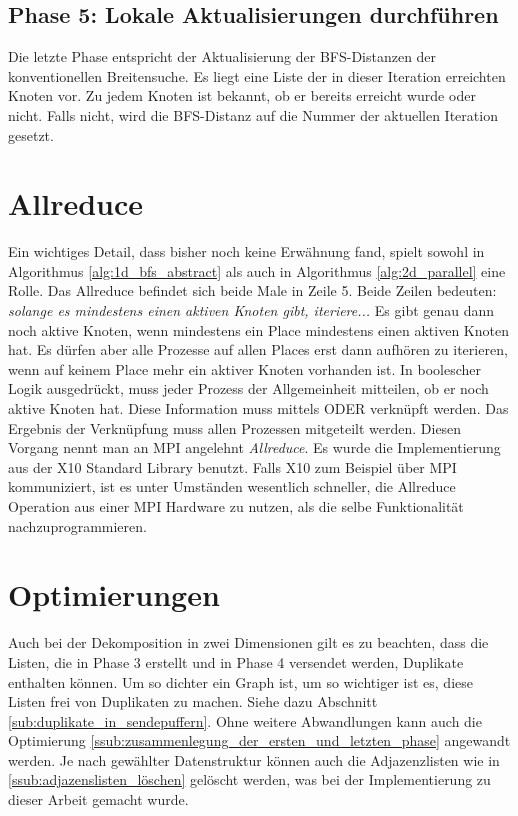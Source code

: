 \subsection{Phase 5: Lokale Aktualisierungen durchführen} %
\label{ssub:lokale_updates_durchf_hren}
Die letzte Phase entspricht der Aktualisierung der BFS-Distanzen der konventionellen Breitensuche. Es liegt eine Liste der in dieser Iteration erreichten Knoten vor. Zu jedem Knoten ist bekannt, ob er bereits erreicht wurde oder nicht. Falls nicht, wird die BFS-Distanz auf die Nummer der aktuellen Iteration gesetzt.

\section{Allreduce} %
\label{sub:allreduce}
Ein wichtiges Detail, dass bisher noch keine Erwähnung fand, spielt sowohl in Algorithmus \ref{alg:1d_bfs_abstract} als auch in Algorithmus \ref{alg:2d_parallel} eine Rolle. Das Allreduce befindet sich beide Male in Zeile 5. Beide Zeilen bedeuten: \textit{solange es mindestens einen aktiven Knoten gibt, iteriere...} Es gibt genau dann noch aktive Knoten, wenn mindestens ein Place mindestens einen aktiven Knoten hat. Es dürfen aber alle Prozesse auf allen Places erst dann aufhören zu iterieren, wenn auf keinem Place mehr ein aktiver Knoten vorhanden ist. In boolescher Logik ausgedrückt, muss jeder Prozess der Allgemeinheit mitteilen, ob er noch aktive Knoten hat. Diese Information muss mittels ODER verknüpft werden. Das Ergebnis der Verknüpfung muss allen Prozessen mitgeteilt werden. Diesen Vorgang nennt man an MPI angelehnt \textit{Allreduce}. Es wurde die Implementierung aus der X10 Standard Library benutzt. Falls X10 zum Beispiel über MPI kommuniziert, ist es unter Umständen wesentlich schneller, die Allreduce Operation aus einer MPI Hardware zu nutzen, als die selbe Funktionalität nachzuprogrammieren.  

\section{Optimierungen} %
\label{sec:optimierungen}
Auch bei der Dekomposition in zwei Dimensionen gilt es zu beachten, dass die Listen, die in Phase 3 erstellt und in Phase 4 versendet werden, Duplikate enthalten können. Um so dichter ein Graph ist, um so wichtiger ist es, diese Listen frei von Duplikaten zu machen. Siehe dazu Abschnitt \ref{sub:duplikate_in_sendepuffern}. Ohne weitere Abwandlungen kann auch die Optimierung \ref{ssub:zusammenlegung_der_ersten_und_letzten_phase} angewandt werden. Je nach gewählter Datenstruktur können auch die Adjazenzlisten wie in \ref{ssub:adjazenslisten_löschen} gelöscht werden, was bei der Implementierung zu dieser Arbeit gemacht wurde. 
